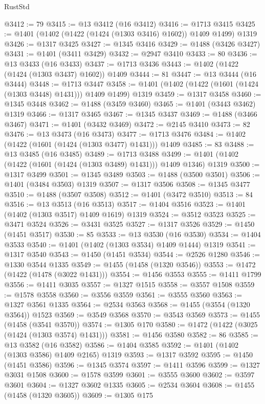 \begin{lexlean}{RustStd}
\begin{coremodule}
{\begin{coremodule}
{{{{{{{{{{{{{{{{{{{{{{{{{{{{{{{{{{{{{{@3412 := 79
@3415 := @13 @3412 (@16 @3412)
@3416 := @1713 @3415
@3425 := @1401 (@1402 (@1422 (@1424 (@1303 @3416) @1602)) @1409 @1499) @1319
@3426 := @1317 @3425
@3427 := @1345 @3416
@3429 := @1488 (@3426 @3427)
@3431 := @1401 (@3411 @3429)
@3432 := @2947 @3410
@3433 := 80
@3436 := @13 @3433 (@16 @3433)
@3437 := @1713 @3436
@3443 := @1402 (@1422 (@1424 (@1303 @3437) @1602)) @1409
@3444 := 81
@3447 := @13 @3444 (@16 @3444)
@3448 := @1713 @3447
@3458 := @1401 (@1402 (@1422 (@1601 (@1424 (@1303 @3448) @1431))) @1409 @1499) @1319
@3459 := @1317 @3458
@3460 := @1345 @3448
@3462 := @1488 (@3459 @3460)
@3465 := @1401 (@3443 @3462) @1319
@3466 := @1317 @3465
@3467 := @1345 @3437
@3469 := @1488 (@3466 @3467)
@3471 := @1401 (@3432 @3469)
@3472 := @2145 @3410
@3473 := 82
@3476 := @13 @3473 (@16 @3473)
@3477 := @1713 @3476
@3484 := @1402 (@1422 (@1601 (@1424 (@1303 @3477) @1431))) @1409
@3485 := 83
@3488 := @13 @3485 (@16 @3485)
@3489 := @1713 @3488
@3499 := @1401 (@1402 (@1422 (@1601 (@1424 (@1303 @3489) @1431))) @1409 @1346) @1319
@3500 := @1317 @3499
@3501 := @1345 @3489
@3503 := @1488 (@3500 @3501)
@3506 := @1401 (@3484 @3503) @1319
@3507 := @1317 @3506
@3508 := @1345 @3477
@3510 := @1488 (@3507 @3508)
@3512 := @1401 (@3472 @3510)
@3513 := 84
@3516 := @13 @3513 (@16 @3513)
@3517 := @1404 @3516
@3523 := @1401 (@1402 (@1303 @3517) @1409 @1619) @1319
@3524 := @3512 @3523
@3525 := @3471 @3524
@3526 := @3431 @3525
@3527 := @1317 @3526
@3529 := @1450 (@1451 @3517)
@3530 := 85
@3533 := @13 @3530 (@16 @3530)
@3534 := @1404 @3533
@3540 := @1401 (@1402 (@1303 @3534) @1409 @1444) @1319
@3541 := @1317 @3540
@3543 := @1450 (@1451 @3534)
@3544 := @2526 @1280
@3546 := @1330 @3544 @1335
@3549 := @1455 (@1458 (@1320 @3546))
@3553 := @1472 (@1422 (@1478 (@3022 @1431)))
@3554 := @1456 @3553
@3555 := @1411 @1799
@3556 := @1411 @3035
@3557 := @1327 @1515
@3558 := @3557 @1508
@3559 := @1578 @3558
@3560 := @3556 @3559
@3561 := @3555 @3560
@3563 := @1327 @3561 @1335
@3564 := @2534 @3563
@3568 := @1455 (@3554 (@1320 @3564)) @1523
@3569 := @3549 @3568
@3570 := @3543 @3569
@3573 := @1455 (@1458 (@3541 @3570))
@3574 := @1305 @170
@3580 := @1472 (@1422 (@3025 (@1424 (@1303 @3574) @1431)))
@3581 := @1456 @3580
@3582 := 86
@3585 := @13 @3582 (@16 @3582)
@3586 := @1404 @3585
@3592 := @1401 (@1402 (@1303 @3586) @1409 @2165) @1319
@3593 := @1317 @3592
@3595 := @1450 (@1451 @3586)
@3596 := @1345 @3574
@3597 := @1411 @3596
@3599 := @1327 @3031 @1508
@3600 := @1578 @3599
@3601 := @3555 @3600
@3602 := @3597 @3601
@3604 := @1327 @3602 @1335
@3605 := @2534 @3604
@3608 := @1455 (@1458 (@1320 @3605))
@3609 := @1305 @175
}}}}}}}}}}}}}}}}}}}}}}}}}}}}}}}}}}}}}}
\end{coremodule}}
\end{coremodule}
\end{lexlean}
